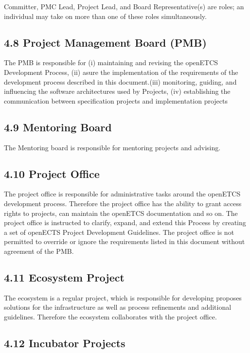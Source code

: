 Committer, PMC Lead, Project Lead, and Board Representative(s) are
roles; an individual may take on more than one of these roles
simultaneously.

\subsection{4.8 Project Management Board
(PMB)}\label{project-management-board-pmb}

The PMB is responsible for (i) maintaining and revising the openETCS
Development Process, (ii) asure the implementation of the requirements
of the development process described in this document.(iii) monitoring,
guiding, and influencing the software architectures used by Projects,
(iv) establishing the communication between specification projects and
implementation projects

\subsection{4.9 Mentoring Board}\label{mentoring-board}

The Mentoring board is responsible for mentoring projects and advising.

\subsection{4.10 Project Office}\label{project-office}

The project office is responsible for administrative tasks around the
openETCS development process. Therefore the project office has the
ability to grant access rights to projects, can maintain the openETCS
documentation and so on. The project office is instructed to clarify,
expand, and extend this Process by creating a set of openECTS Project
Development Guidelines. The project office is not permitted to override
or ignore the requirements listed in this document without agreement of
the PMB.

\subsection{4.11 Ecosystem Project}\label{ecosystem-project}

The ecosystem is a regular project, which is responsible for developing
proposes solutions for the infrastructure as well as process refinements
and additional guidelines. Therefore the ecosystem collaborates with the
project office.

\subsection{4.12 Incubator Projects}\label{incubator-projects}


